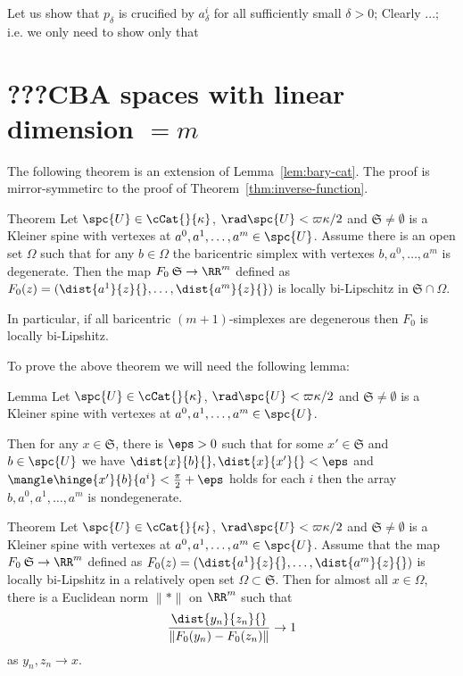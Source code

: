 Let us show that $p_\delta$ is crucified by $a^i_\delta$ for all sufficiently small $\delta>0$;
Clearly ...;
i.e. we only need to show only that 













\section{???CBA spaces with linear dimension $=m$}

The following theorem is an extension of Lemma~\ref{lem:bary-cat}.
The proof is mirror-symmetirc to the proof of Theorem~\ref{thm:inverse-function}.

\begin{thm}{Theorem}
Let $\spc{U}\in\cCat{}{\kappa}$,
$\rad\spc{U}<\varpi\kappa/2$
and $\mathfrak{S}\not=\emptyset$ is a Kleiner spine
with vertexes at $a^0,a^1,\dots,a^m\in \spc{U}$.
Assume there is an open set $\Omega$
such that for any $b\in \Omega$ the baricentric simplex with vertexes $b,a^0,\dots,a^m$ is degenerate.
Then the map $F_0\:\mathfrak{S}\to\RR^m$ defined as  $F_0(z)=(\dist{a^1}{z}{},\dots,\dist{a^m}{z}{})$
is locally bi-Lipschitz in $\mathfrak{S}\cap\Omega$.

In particular, if all baricentric $(m+1)$-simplexes are degenerous then $F_0$ is locally bi-Lipshitz.
\end{thm}

To prove the above theorem we will need the following lemma:

\begin{thm}{Lemma}\label{lem:nondeg-bs-test}
Let $\spc{U}\in\cCat{}{\kappa}$,
$\rad\spc{U}<\varpi\kappa/2$
and $\mathfrak{S}\not=\emptyset$ is a Kleiner spine
with vertexes at $a^0,a^1,\dots,a^m\in \spc{U}$.

Then for any $x\in \mathfrak{S}$,
there is $\eps>0$ such that for some $x'\in \mathfrak{S}$ and $b\in\spc{U}$
we have 
$\dist{x}{b}{}, \dist{x}{x'}{}<\eps$ 
and $\mangle\hinge{x'}{b}{a^i}<\tfrac\pi2+\eps$ 
holds for each $i$
then the array $b,a^0,a^1,\dots,a^m$ is nondegenerate.
\end{thm}


\begin{thm}{Theorem}
Let $\spc{U}\in\cCat{}{\kappa}$,
$\rad\spc{U}<\varpi\kappa/2$
and $\mathfrak{S}\not=\emptyset$ is a Kleiner spine
with vertexes at $a^0,a^1,\dots,a^m\in \spc{U}$.
Assume that the map $F_0\:\mathfrak{S}\to\RR^m$ defined as  $F_0(z)=(\dist{a^1}{z}{},\dots,\dist{a^m}{z}{})$
is locally bi-Lipshitz in a relatively open set $\Omega\subset \mathfrak{S}$.
Then for almost all $x\in \Omega$,
there is a Euclidean norm $\|{*}\|$ on $\RR^m$ 
such that 
$$\frac{\dist{y_n}{z_n}{}}{\|F_0(y_n)-F_0(z_n)\|}\to 1$$
as $y_n,z_n\to x$.
\end{thm}




